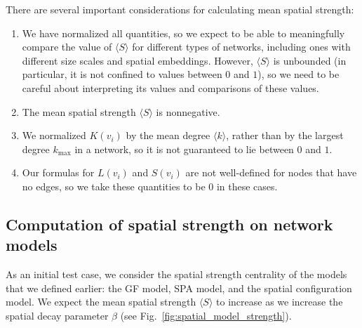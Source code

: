 \documentclass[%
 reprint,
 amsmath,amssymb,
 aps,
]{revtex4-1}
\begin{document}

There are several important considerations for calculating mean spatial strength:
\begin{enumerate}
    \item We have normalized all quantities, so we expect to be able to meaningfully compare the value of $\langle S \rangle$ for different types of networks, including ones with different size scales and spatial embeddings. However, $\langle S \rangle$ is unbounded (in particular, it is not confined to values between $0$ and $1$), so we need to be careful about interpreting its values and comparisons of these values.
    \item The mean spatial strength $\langle S \rangle$ is nonnegative.
    \item We normalized $K(v_i)$ by the mean degree $\langle k \rangle$, rather than by the largest degree $k_{\mathrm{max}}$ in a network, so it is not guaranteed to lie between $0$ and $1$.
    \item Our formulas for $L(v_i)$ and $S(v_i)$ are not well-defined for nodes that have no edges, so we take these quantities to be $0$ in these cases.
\end{enumerate}


\subsection{Computation of spatial strength on network models}\label{sec:computed_ss}

As an initial test case, we consider the spatial strength centrality of the models that we defined earlier: the GF model, SPA model, and the spatial configuration model. We expect the mean spatial strength $\langle S \rangle$ to increase as we increase the spatial decay parameter $\beta$ (see Fig.~\ref{fig:spatial_model_strength}).
\end{document}
